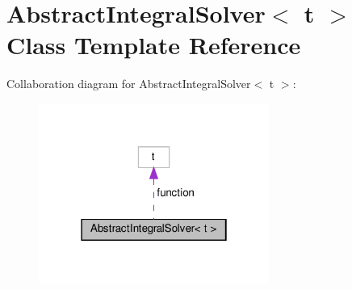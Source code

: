 \hypertarget{class_abstract_integral_solver}{}\section{Abstract\+Integral\+Solver$<$ t $>$ Class Template Reference}
\label{class_abstract_integral_solver}


Collaboration diagram for Abstract\+Integral\+Solver$<$ t $>$\+:
\nopagebreak
\begin{figure}[H]
\begin{center}
\leavevmode
\includegraphics[width=214pt]{class_abstract_integral_solver__coll__graph}
\end{center}
\end{figure}

